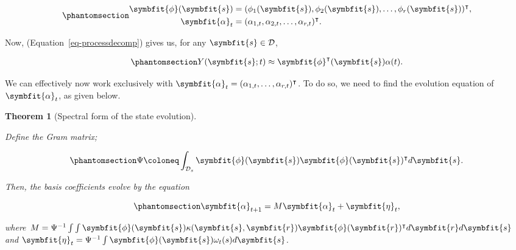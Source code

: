 \documentclass[
]{report}
\newcommand{\bv}[1]{\symbfit{#1}}
\theoremstyle{plain}
\theoremstyle{plain}
\theoremstyle{plain}
\newtheorem{theorem}{Theorem}[section]
\theoremstyle{remark}
\begin{document}
\begin{equation}\phantomsection\label{eq-vecmats}{\begin{split}
\bv \phi(\bv s) &= (\phi_1(\bv s), \phi_2(\bv s), \dots, \phi_r(\bv s))^{\intercal},\\
\bv \alpha_t &= (\alpha_{1,t}, \alpha_{2,t}, \dots, \alpha_{r, t})^{\intercal}.
\end{split}
}\end{equation}

Now, (Equation~\ref{eq-processdecomp}) gives us, for any
\(\bv s\in \mathcal D\),

\begin{equation}\phantomsection\label{eq-pbvec}{\begin{split}
Y(\bv s; t) \approx \bv \phi^{\intercal}(\bv s)  \alpha(t).\\
\end{split}
}\end{equation}

We can effectively now work exclusively with
\(\bv \alpha_t = (\alpha_{1,t},\dots, \alpha_{r,t})^\intercal\). To do
so, we need to find the evolution equation of \(\bv \alpha_t\), as given
below.

\begin{theorem}[Spectral form of the state
evolution]\protect\hypertarget{thm-state_form}{}\label{thm-state_form}

Define the \emph{Gram matrix};

\begin{equation}\phantomsection\label{eq-gram}{\Psi \coloneq \int_{\mathcal D_s} \bv \phi(\bv s) \bv \phi(\bv s)^\intercal d\bv s.
}\end{equation}

Then, the basis coefficients evolve by the equation

\begin{equation}\phantomsection\label{eq-stateev}{\bv \alpha_{t+1} = M \bv\alpha_t + \bv\eta_t,
}\end{equation}

where
\(M = \Psi^{-1} \int\int \bv\phi(\bv s) \kappa(\bv s, \bv r)\bv\phi(\bv r)^\intercal d\bv r d \bv s\)
and \(\bv\eta_t =\Psi^{-1} \int \bv \phi(\bv s)\omega_t(s)d\bv s\).

\end{theorem}
\end{document}
